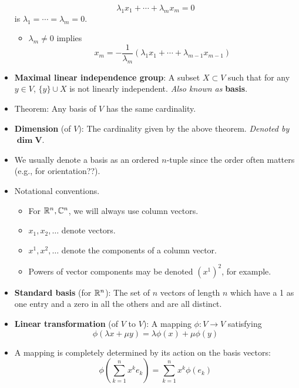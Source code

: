 \documentclass[../notes.tex]{subfiles}
\begin{document}
\begin{itemize}
\begin{equation*}
        \lambda_1x_1+\cdots+\lambda_mx_m = 0
    \end{equation*}
    is $\lambda_1=\cdots=\lambda_m=0$.
    \begin{itemize}
        \item $\lambda_m\neq 0$ implies
        \begin{equation*}
            x_m = -\frac{1}{\lambda_m}(\lambda_1x_1+\cdots+\lambda_{m-1}x_{m-1})
        \end{equation*}
    \end{itemize}
    \item \textbf{Maximal linear independence group}: A subset $X\subset V$ such that for any $y\in V$, $\{y\}\cup X$ is not linearly independent. \emph{Also known as} \textbf{basis}.
    \item Theorem: Any basis of $V$ has the same cardinality.
    \item \textbf{Dimension} (of $V$): The cardinality given by the above theorem. \emph{Denoted by} $\bm{\dim V}$.
    \item We usually denote a basis as an ordered $n$-tuple since the order often matters (e.g., for orientation??).
    \item Notational conventions.
    \begin{itemize}
        \item For $\mathbb{R}^n,\mathbb{C}^n$, we will always use column vectors.
        \item $x_1,x_2,\dots$ denote vectors.
        \item $x^1,x^2,\dots$ denote the components of a column vector.
        \item Powers of vector components may be denoted $(x^1)^2$, for example.
    \end{itemize}
    \item \textbf{Standard basis} (for $\mathbb{R}^n$): The set of $n$ vectors of length $n$ which have a 1 as one entry and a zero in all the others and are all distinct.
    \item \textbf{Linear transformation} (of $V$ to $V$): A mapping $\phi:V\to V$ satisfying
    \begin{equation*}
        \phi(\lambda x+\mu y) = \lambda\phi(x)+\mu\phi(y)
    \end{equation*}
    \item A mapping is completely determined by its action on the basis vectors:
    \begin{equation*}
        \phi\left( \sum_{k=1}^nx^ke_k \right) = \sum_{k=1}^nx^k\phi(e_k)
    \end{equation*}

\end{itemize}
\end{document}
